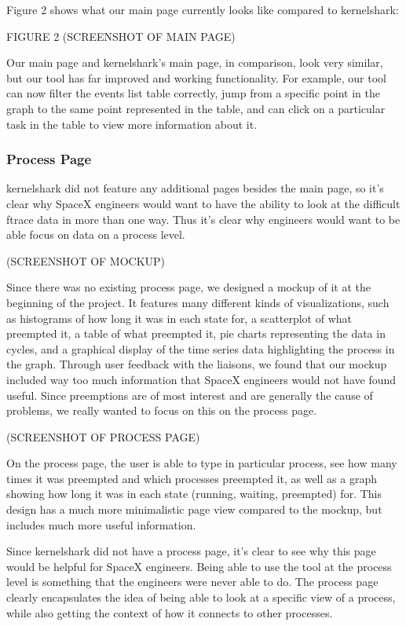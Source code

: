\documentclass{hmcclinic}
\begin{document}
Figure 2 shows what our main page currently looks like compared to kernelshark:

FIGURE 2 (SCREENSHOT OF MAIN PAGE)

Our main page and kernelshark's main page, in comparison, look very similar, but our tool has far improved and working functionality. For example, our tool can now filter the events list table correctly, jump from a specific point in the graph to the same point represented in the table, and can click on a particular task in the table to view more information about it.

\subsubsection{Process Page}

kernelshark did not feature any additional pages besides the main page, so it's clear why SpaceX engineers would want to have the ability to look at the difficult ftrace data in more than one way. Thus it's clear why engineers would want to be able focus on data on a process level.

(SCREENSHOT OF MOCKUP)

Since there was no existing process page, we designed a mockup of it at the beginning of the project. It features many different kinds of visualizations, such as histograms of how long it was in each state for, a scatterplot of what preempted it, a table of what preempted it, pie charts representing the data in cycles, and a graphical display of the time series data highlighting the process in the graph. Through user feedback with the liaisons, we found that our mockup included way too much information that SpaceX engineers would not have found useful. Since preemptions are of most interest and are generally the cause of problems, we really wanted to focus on this on the process page.

(SCREENSHOT OF PROCESS PAGE)

On the process page, the user is able to type in particular process, see how many times it was preempted and which processes preempted it, as well as a graph showing how long it was in each state (running, waiting, preempted) for. This design has a much more minimalistic page view compared to the mockup, but includes much more useful information.

Since kernelshark did not have a process page, it's clear to see why this page would be helpful for SpaceX engineers. Being able to use the tool at the process level is something that the engineers were never able to do. The process page clearly encapsulates the idea of being able to look at a specific view of a process, while also getting the context of how it connects to other processes.
\end{document}
